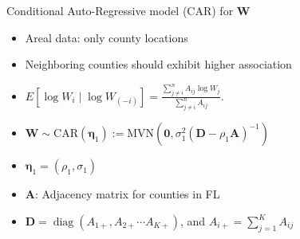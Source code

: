 \documentclass{beamer}
\begin{document}
\begin{frame}{Conditional Auto-Regressive model (CAR) for $\mathbf{W}$}
\protect\hypertarget{conditional-auto-regressive-model-car}{}
\begin{itemize}
\vfill \item
  Areal data: only county locations
\vfill \item
  Neighboring counties should exhibit higher association



\vfill \item 
$E[\log {W}_i \mid \log {W}_{(-i)}] = \frac{\sum_{j \neq i}^{n} {A}_{ij} \log{W}_j}{\sum_{j \neq i}^{n} {A}_{ij}}.$
\pause

    

   \vfill \item $\mathbf{W}\sim \text{CAR}(\boldsymbol{\eta}_1):=\text{MVN}(\mathbf{0},\sigma_1^2(\mathbf{D}-\rho_1 \mathbf{A})^{-1})$
       
     \vfill \item $\boldsymbol{\eta}_1=(\rho_1,\sigma_1)$
   \vfill \item \(\mathbf{A}\): Adjacency matrix for counties in FL
     \vfill  \item $\mathbf{D}=\operatorname{diag}(A_{1+},A_{2+} \cdots A_{K+})$, and $ A_{i+}=\sum_{j = 1}^K A_{ij}$
\end{itemize}
\end{frame}
\end{document}
